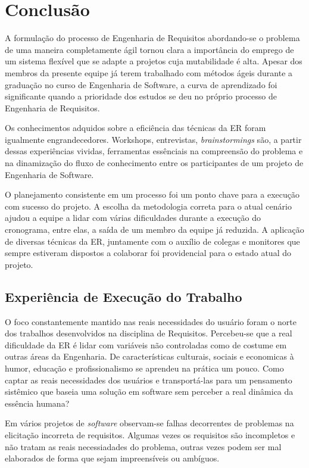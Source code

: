 \chapter{Conclusão}

A formulação do processo de Engenharia de Requisitos abordando-se o problema de uma maneira completamente ágil tornou clara a importância do emprego de um sistema flexível que se adapte a projetos cuja mutabilidade é alta. Apesar dos membros da presente equipe já terem trabalhado com métodos ágeis durante a graduação no curso de Engenharia de Software, a curva de aprendizado foi significante quando a prioridade dos estudos se deu no próprio processo de Engenharia de Requisitos.

Os conhecimentos adquidos sobre a eficiência das técnicas da ER foram igualmente engrandecedores. Workshops, entrevistas, \textit{brainstormings} são, a partir dessas experiências vividas, ferramentas essênciais na compreensão do problema e na dinamização do fluxo de conhecimento entre os participantes de um projeto de Engenharia de Software.

O planejamento consistente em um processo foi um ponto chave para a execução com sucesso do projeto. A escolha da metodologia correta para o atual cenário ajudou a equipe a lidar com várias dificuldades durante a execução do cronograma, entre elas, a saída de um membro da equipe já reduzida. A aplicação de diversas técnicas da ER, juntamente com o auxílio de colegas e monitores que sempre estiveram dispostos a colaborar foi providencial para o estado atual do projeto.

\section{Experiência de Execução do Trabalho} \label{expext}

O foco constantemente mantido nas reais necessidades do usuário foram o norte dos trabalhos desenvolvidos na disciplina de Requisitos. Percebeu-se que a real dificuldade da ER é lidar com variáveis não controladas como de costume em outras áreas da Engenharia. De características culturais, sociais e economicas à humor, educação e profissionalismo se aprendeu na prática um pouco. Como captar as reais necessidades dos usuários e transportá-las para um pensamento sistêmico que baseia uma solução em software sem perceber a real dinâmica da essência humana?

Em vários projetos de \textit{software} observam-se falhas decorrentes de problemas na elicitação incorreta de requisitos. Algumas vezes os requisitos são incompletos e não tratam as reais necessiadades do problema, outras vezes podem ser mal elaborados de forma que sejam impreensíveis ou ambíguos.

